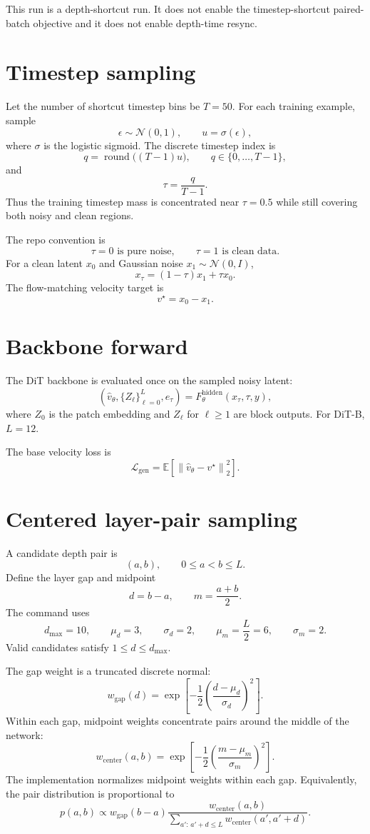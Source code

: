 \documentclass[11pt]{article}
\begin{document}
This run is a depth-shortcut run. It does not enable the timestep-shortcut
paired-batch objective and it does not enable depth-time resync.

\section{Timestep sampling}

Let the number of shortcut timestep bins be $T=50$. For each training example,
sample
\[
  \epsilon \sim \mathcal{N}(0,1),
  \qquad
  u=\sigma(\epsilon),
\]
where $\sigma$ is the logistic sigmoid. The discrete timestep index is
\[
  q = \operatorname{round}\bigl((T-1)u\bigr),
  \qquad
  q\in\{0,\ldots,T-1\},
\]
and
\[
  \tau = \frac{q}{T-1}.
\]
Thus the training timestep mass is concentrated near $\tau=0.5$ while still
covering both noisy and clean regions.

The repo convention is
\[
  \tau=0 \text{ is pure noise}, \qquad \tau=1 \text{ is clean data}.
\]
For a clean latent $x_0$ and Gaussian noise $x_1\sim\mathcal{N}(0,I)$,
\[
  x_\tau = (1-\tau)x_1 + \tau x_0.
\]
The flow-matching velocity target is
\[
  v^\star = x_0 - x_1.
\]

\section{Backbone forward}

The DiT backbone is evaluated once on the sampled noisy latent:
\[
  \left(
    \hat v_\theta,\{Z_\ell\}_{\ell=0}^{L},e_\tau
  \right)
  =
  F_\theta^{\mathrm{hidden}}(x_\tau,\tau,y),
\]
where $Z_0$ is the patch embedding and $Z_\ell$ for $\ell\ge1$ are block
outputs. For DiT-B, $L=12$.

The base velocity loss is
\[
  \mathcal{L}_{\mathrm{gen}}
  =
  \mathbb{E}\left[
    \left\|\hat v_\theta - v^\star\right\|_2^2
  \right].
\]

\section{Centered layer-pair sampling}

A candidate depth pair is
\[
  (a,b), \qquad 0\le a < b \le L.
\]
Define the layer gap and midpoint
\[
  d=b-a,\qquad m=\frac{a+b}{2}.
\]
The command uses
\[
  d_{\max}=10,\qquad \mu_d=3,\qquad \sigma_d=2,
  \qquad \mu_m=\frac{L}{2}=6,\qquad \sigma_m=2.
\]
Valid candidates satisfy $1\le d\le d_{\max}$.

The gap weight is a truncated discrete normal:
\[
  w_{\mathrm{gap}}(d)
  =
  \exp\left[
    -\frac{1}{2}
    \left(\frac{d-\mu_d}{\sigma_d}\right)^2
  \right].
\]
Within each gap, midpoint weights concentrate pairs around the middle of the
network:
\[
  w_{\mathrm{center}}(a,b)
  =
  \exp\left[
    -\frac{1}{2}
    \left(\frac{m-\mu_m}{\sigma_m}\right)^2
  \right].
\]
The implementation normalizes midpoint weights within each gap. Equivalently,
the pair distribution is proportional to
\[
  p(a,b)
  \propto
  w_{\mathrm{gap}}(b-a)
  \frac{
    w_{\mathrm{center}}(a,b)
  }{
    \sum_{a':\,a'+d\le L} w_{\mathrm{center}}(a',a'+d)
  }.
\]
\end{document}
